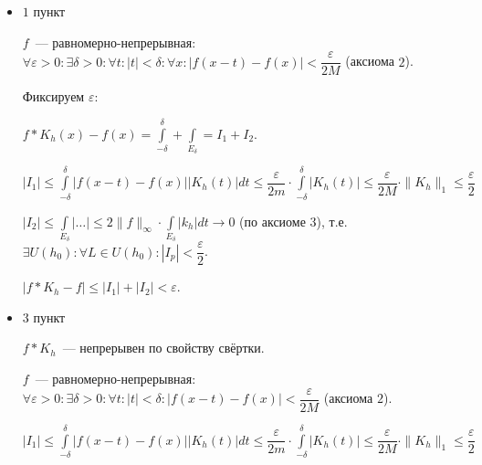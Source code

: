 \documentclass{article}
\begin{document}
            \begin{itemize}
            
                \item $1$ пункт
                    
                    $f$~--- равномерно-непрерывная: $\forall \varepsilon > 0 : \exists \delta > 0 : \forall t : |t| < \delta : \forall x : \left| f(x - t) - f(x) \right| < \dfrac{\varepsilon}{2 M}$ (аксиома $2$).
                
                    Фиксируем $\varepsilon$:
                    
                        $f * K_h(x) - f(x) = \int\limits^{\delta}_{-\delta} + \int\limits_{E_{\delta}} = I_1 + I_2$.
                        
                        $\left| I_1 \right| \leqslant \int\limits^{\delta}_{-\delta} \left| f(x - t) - f(x) \right| \left| K_h(t) \right| dt \leqslant \dfrac{\varepsilon}{2 m} \cdot \int\limits^{\delta}_{-\delta} | K_h(t) | \leqslant \dfrac{\varepsilon}{2 M} \cdot \| K_h \|_1 \leqslant \dfrac{\varepsilon}{2}$
                        
                        $\left| I_2 \right| \leqslant \int\limits_{E_{\delta}} | \ldots | \leqslant 2 \| f \|_{\infty} \cdot \int\limits_{E_{\delta}} |k_h| dt \rightarrow 0$ (по аксиоме $3$), т.е. $\exists U(h_0) : \forall L \in U(h_0) : \left| I_p \right| < \dfrac{\varepsilon}{2}$.
                        
                        $\left| f * K_h - f \right| \leqslant \left| I_1 \right| + \left| I_2 \right| < \varepsilon$.
                        
                \item $3$ пункт
                
                    $f * K_h$~--- непрерывен по свойству свёртки.
                    
                        $f$~--- равномерно-непрерывная: $\forall \varepsilon > 0 : \exists \delta > 0 : \forall t : |t| < \delta : \left| f(x - t) - f(x) \right| < \dfrac{\varepsilon}{2 M}$ (аксиома $2$).
                        
                        $\left| I_1 \right| \leqslant \int\limits^{\delta}_{-\delta} \left| f(x - t) - f(x) \right| \left| K_h(t) \right| dt \leqslant \dfrac{\varepsilon}{2 m} \cdot \int\limits^{\delta}_{-\delta} | K_h(t) | \leqslant \dfrac{\varepsilon}{2 M} \cdot \| K_h \|_1 \leqslant \dfrac{\varepsilon}{2}$
                        

\end{itemize}
\end{document}
